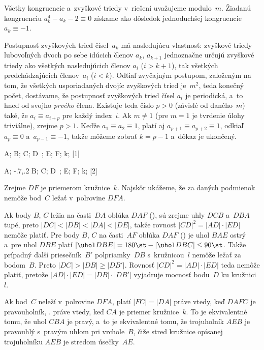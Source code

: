 {%
Všetky kongruencie a~zvyškové triedy v~riešení uvažujeme modulo~$m$.
Žiadanú kongruenciu $a_k^4-a_k-2\equiv 0$ získame ako dôsledok
jednoduchšej kongruencie $a_k\equiv {-1}$.

Postupnosť zvyškových tried čísel~$a_k$ má nasledujúcu vlastnosť:
zvyškové triedy ľubovoľných dvoch po sebe idúcich členov $a_k$,
$a_{k+1}$ jednoznačne určujú zvyškové triedy ako všetkých
nasledujúcich členov $a_i$ ($i>k+1$), tak všetkých predchádzajúcich členov~$a_i$
($i<k$). Odtiaľ zvyčajným postupom, založeným na tom, že
všetkých usporiadaných dvojíc zvyškových tried je~$m^2$, teda konečný
počet, dostávame, že postupnosť zvyškových tried čísel $a_i$ je
periodická, a~to hneď od svojho {\it prvého\/} člena. Existuje
teda číslo $p>0$ (závislé od daného~$m$) také, že
$a_i\equiv a_{i+p}$ pre každý index~$i$. Ak $m\ne1$ (pre $m=1$
je tvrdenie úlohy triviálne), zrejme $p>1$. Keďže $a_1\equiv
a_2\equiv1$, platí aj $a_{p+1}\equiv a_{p+2}\equiv1$, odkiaľ
$a_p\equiv0$ a~$a_{p-1}\equiv{-1}$, takže môžeme zobrať $k=p-1$ 
a~dôkaz je ukončený.
}

{%
\fontplace
\brpoint A; \tpoint B;
\tpoint C; \tpoint D\ ; \tpoint E;
\lBpoint F; \rBpoint k;
[1] \hfil\Obr

\fontplace
\tpoint A; \lbpoint\xy-.7,.2 B;
\lBpoint C; \tpoint D\ ; \tpoint E;
\lBpoint F; \rBpoint k;
[2] \hfil\Obr

Zrejme $DF$ je priemerom kružnice~$k$. Najskôr ukážeme, že za
daných podmienok nemôže bod~$C$ ležať v~polrovine $DFA$.


Ak body $B$, $C$ ležia na časti~$DA$ oblúka $DAF$ (\obr),
sú zrejme uhly $DCB$ a~$DBA$ tupé, preto $|DC|<|DB|<|DA|<|DE|$,
takže rovnosť $|CD|^2=|AD|\cdot|ED|$ nemôže platiť.
Pre body $B$, $C$ na časti~$AF$ oblúka $DAF$ (\obr)
je uhol $BAE$ ostrý a~pre uhol $DBE$ platí $|\uhol DBE|=180\st-|\uhol
DBC|\le90\st$. Takže prípadný ďalší priesečník~$B'$ polpriamky~$DB$
s~kružnicou~$l$ nemôže ležať za bodom~$B$. Preto
$|DC|>|DB|\ge|DB'|$. Rovnosť $|CD|^2=|AD|\cdot|ED|$ teda nemôže
platiť, pretože $|AD|\cdot|ED|=|DB|\cdot|DB'|$ vyjadruje
mocnosť bodu~$D$ ku kružnici~$l$.

\twocpictures{}

Ak bod~$C$ neleží v~polrovine $DFA$, platí $|FC|=|DA|$
práve vtedy, keď $DAFC$ je pravouholník, \tj. práve vtedy, keď $CA$ je priemer
kružnice~$k$. To je ekvivalentné tomu, že uhol $CBA$ je pravý, 
a~to je ekvivalentné tomu, že trojuholník $AEB$ je pravouhlý s~pravým
uhlom pri vrchole~$B$, čiže stred kružnice opísanej trojuholníku $AEB$
je stredom úsečky~$AE$.
}

